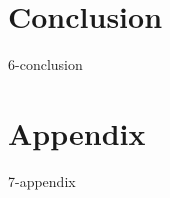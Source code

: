 \documentclass[aspectratio=169,12pt]{beamer}
\begin{document}
\section*{Conclusion}
{6-conclusion}


\appendix

\section*{Appendix}
{7-appendix}
\end{document}
